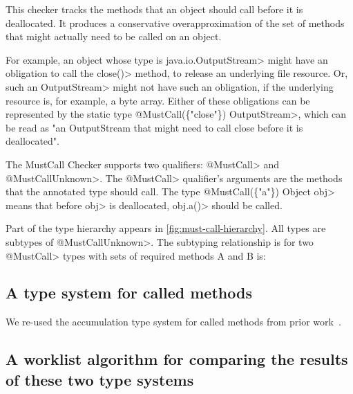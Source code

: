 This checker tracks the methods that an object should call before it
is deallocated. It produces a conservative overapproximation of the
set of methods that might actually need to be called on an object.

For example, an object whose type is \<java.io.OutputStream> might
have an obligation to call the \<close()> method, to release an
underlying file resource. Or, such an \<OutputStream> might not have
such an obligation, if the underlying resource is, for example, a byte
array. Either of these obligations can be represented by the static
type \<@MustCall(\{"close"\}) OutputStream>, which can be read as "an
OutputStream that might need to call close before it is deallocated".

The MustCall Checker supports two qualifiers: \<@MustCall> and
\<@MustCallUnknown>. The \<@MustCall> qualifier's arguments are the
methods that the annotated type should call. The type
\<@MustCall(\{"a"\}) Object obj> means that before \<obj> is
deallocated, \<obj.a()> should be called.

Part of the type hierarchy appears in \cref{fig:must-call-hierarchy}.
All types are subtypes of \<@MustCallUnknown>.
The subtyping relationship is for two \<@MustCall> types with sets
of required methods A and B is:

\subsection{A type system for called methods}
\label{sec:called-methods}

We re-used the accumulation type system for called methods from
prior work~\cite{kellogg20verifying}. 

\subsection{A worklist algorithm for comparing the results of these two type systems}
\label{sec:must-call-invoked}



